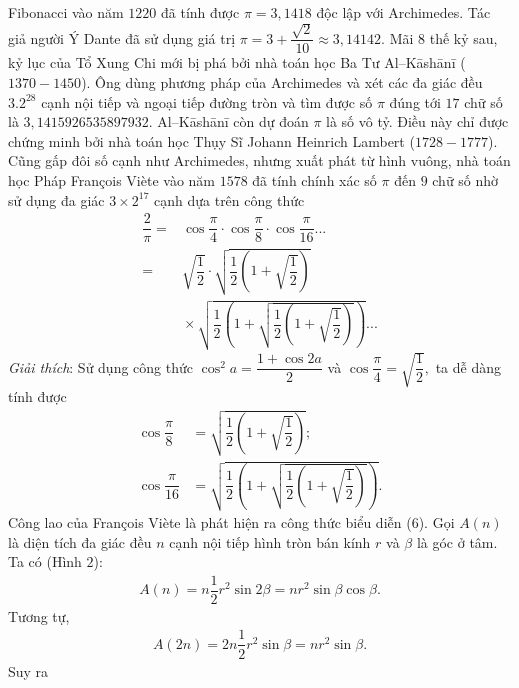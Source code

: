 \begin{multicols}{2}
	\vskip 0.1cm 
	Fibonacci vào năm $1220$ đã tính được $\pi  = 3{,}1418$  độc lập với Archimedes. 
	\vskip 0.1cm
	Tác giả người Ý Dante đã sử dụng giá trị  $\pi  = 3 + \dfrac{{\sqrt 2 }}{{10}} \approx 3{,}14142.$
	\vskip 0.1cm 
	Mãi $8$ thế kỷ sau, kỷ lục của Tổ Xung Chi mới bị phá bởi nhà toán học Ba Tư Al--Kāshānī ($1370-1450$). Ông dùng phương pháp của Archimedes và xét các đa giác đều $3.2^{28}$ cạnh nội tiếp và ngoại tiếp đường tròn và tìm được số $\pi$ đúng tới $17$ chữ số là $3{,}1415926535897932$.  Al--Kāshānī còn dự đoán $\pi$ là số vô tỷ. Điều này chỉ được chứng minh bởi nhà toán học Thụy Sĩ Johann Heinrich Lambert ($1728 - 1777$).
	\vskip 0.1cm 
	Cũng gấp đôi số cạnh như Archimedes, nhưng xuất phát từ hình vuông, nhà toán học Pháp François Viète vào năm $1578$ đã tính chính xác số $\pi$  đến $9$ chữ số nhờ sử dụng đa giác  $3 \times 2^{17}$ cạnh dựa trên công thức
	\begin{align*}
			\dfrac{2}{\pi } = &\cos \dfrac{\pi }{4} \cdot \cos \dfrac{\pi }{8} \cdot \cos \dfrac{\pi }{{16}}...\\
			= &\sqrt {\dfrac{1}{2}}  \cdot \sqrt {\dfrac{1}{2}\left( {1 + \sqrt {\dfrac{1}{2}} } \right)}  \\
			 &\!\times\!\sqrt {\dfrac{1}{2}\left( {1 \!+\! \sqrt {\dfrac{1}{2}\left(\! {1 \!+\! \sqrt {\dfrac{1}{2}} } \!\right)} } \right)} ... \tag{$6$}
	\end{align*}
	\textit{Giải thích}: Sử dụng công thức ${\cos ^2}a = \dfrac{{1 + \cos 2a}}{2}$  và $\cos \dfrac{\pi }{4} = \sqrt {\dfrac{1}{2}},$ ta dễ dàng tính được 
	\begin{align*}
		\cos \dfrac{\pi }{8} &= \sqrt {\dfrac{1}{2}\left( {1 + \sqrt {\dfrac{1}{2}} } \right)};\\
		\cos \dfrac{\pi }{{16}} &= \sqrt {\dfrac{1}{2}\left( {1 + \sqrt {\dfrac{1}{2}\left( {1 + \sqrt {\dfrac{1}{2}} } \right)} } \right)}.
	\end{align*}
	Công lao của François Viète là phát hiện ra công thức biểu diễn ($6$).
	\vskip 0.1cm
	Gọi $A(n)$  là diện tích đa giác đều $n$  cạnh nội tiếp hình tròn bán kính  $r$ và $\beta$ là góc ở tâm.  Ta có (Hình $2$):
	\begin{align*}
		A(n) = n\dfrac{1}{2}{r^2}\sin 2\beta  = n{r^2}\sin \beta \cos \beta .
	\end{align*}
	Tương tự,  
	\begin{align*}
		A(2n) = 2n\dfrac{1}{2}{r^2}\sin \beta  = n{r^2}\sin \beta .
	\end{align*}
	Suy ra
	\begin{align*}

\end{align*}
\end{multicols}
